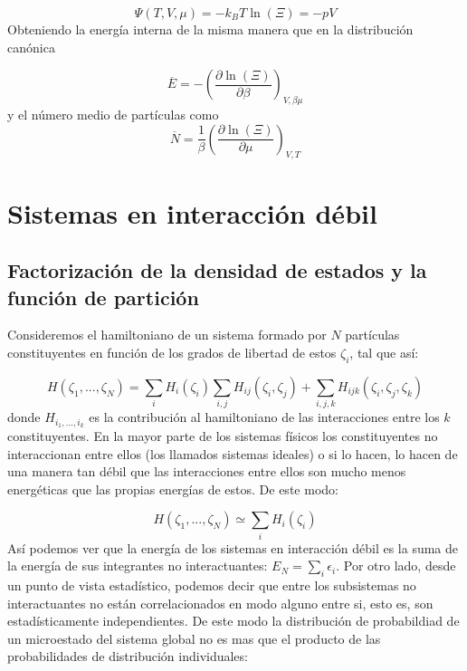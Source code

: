 \documentclass[12pt,a4paper]{article}
\numberwithin{equation}{section}
\numberwithin{figure}{section}
\newcommand{\parentesis}[1]{\left( #1  \right)}
\newcommand{\parciales}[2]{\frac{\partial #1}{\partial #2}}
\theoremstyle{definition}
\begin{document}
\begin{equation}
\Psi (T,V,\mu) = - k_B T \ln (\Xi) = - pV
\end{equation}
Obteniendo la energía interna de la misma manera que en la distribución canónica

\begin{equation}
\overline{E} =- \parentesis{\parciales{\ln (\Xi)}{\beta}}_{V,\beta \mu}
\end{equation}
y el número medio de partículas como 
\begin{equation}
\overline{N} = \frac{1}{\beta} \parentesis{\parciales{\ln (\Xi)}{\mu}}_{V,T}
\end{equation}

\newpage

\section{Sistemas en interacción débil}
\subsection{Factorización de la densidad de estados y la función de partición}
Consideremos el hamiltoniano de un sistema formado por $N$ partículas constituyentes en función de los grados de libertad de estos $\zeta_i$, tal que así:

\begin{equation}
H(\zeta_1,...,\zeta_N) = \sum_i H_i (\zeta_i) \sum_{i,j} H_{ij} (\zeta_i,\zeta_j) + \sum_{i,j,k} H_{ijk} (\zeta_i,\zeta_j,\zeta_k)
\end{equation}
donde $H_{i_1,...,i_k}$ es la contribución al hamiltoniano de las interacciones entre los $k$ constituyentes. En la mayor parte de los sistemas físicos los constituyentes no interaccionan entre ellos (los llamados sistemas ideales) o si lo hacen, lo hacen  de una manera tan débil que las interacciones entre ellos son mucho menos energéticas que las propias energías de estos. De este modo:

\begin{equation}
H ( \zeta_1,...,\zeta_N) \simeq \sum_i H_i (\zeta_i)
\end{equation}
Así podemos ver que la energía de los sistemas en interacción débil es la suma de la energía de sus integrantes no interactuantes: $E_N = \sum_i \epsilon_i$. Por otro lado, desde un punto de vista estadístico, podemos decir que entre los subsistemas no interactuantes no están correlacionados en modo alguno entre si, esto es, son estadísticamente independientes. De este modo la distribución de probabildiad de un microestado del sistema global no es mas que el producto de las probabilidades de distribución individuales:
\end{document}
